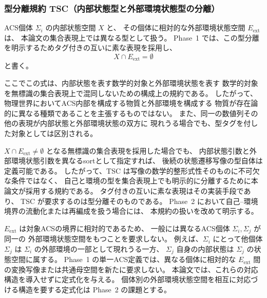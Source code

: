 \subsubsection*{型分離規約 TSC（内部状態型と外部環境状態型の分離）}
\label{conv:TSC}

ACS個体 $\Sigma_i$ の内部状態空間 $X$ と、
その個体に相対的な外部環境状態空間 $E_{\mathrm{ext}}$ は、
本論文の集合表現上では異なる型として扱う。
Phase~1 では、この型分離を明示するためタグ付きの互いに素な表現を採用し、
\[
  X\cap E_{\mathrm{ext}}=\emptyset
\]
と書く。

ここでこの式は、内部状態を表す数学的対象と外部環境状態を表す
数学的対象を無標識の集合表現上で混同しないための構成上の規約である。
したがって、物理世界においてACS内部を構成する物質と外部環境を構成する
物質が存在論的に異なる種類であることを主張するものではない。
また、同一の数値列その他の表現が内部状態と外部環境状態の双方に
現れうる場合でも、型タグを付した対象としては区別される。

\begin{remark}[TSCの性格]
\label{rem:TSC_character}
$X\cap E_{\mathrm{ext}}\neq\emptyset$ となる無標識の集合表現を採用した場合でも、
内部状態引数と外部環境状態引数を異なるsortとして指定すれば、
後続の状態遷移写像の型自体は定義可能である。
したがって、TSC は写像の数学的整形式性そのものに不可欠な条件ではなく、
自己と環境の型を集合表現上でも明示的に分離するために本論文が採用する規約である。
タグ付きの互いに素な表現はその実装手段であり、
TSC が要求するのは型分離そのものである。
Phase~2 において自己--環境境界の流動化または再編成を扱う場合には、
本規約の扱いを改めて明示する。
\end{remark}

\begin{remark}[外部環境状態空間の個体相対性]
\label{rem:Eext_relative}
$E_{\mathrm{ext}}$ は対象ACSの境界に相対的であるため、
一般には異なるACS個体 $\Sigma_i,\Sigma_j$ が同一の
外部環境状態空間をもつことを要求しない。
例えば、$\Sigma_i$ にとって他個体 $\Sigma_j$ は
$\Sigma_i$ の外部環境の一部として現れうる一方、
$\Sigma_j$ 自身の内部状態は $\Sigma_j$ の状態空間に属する。
Phase~1 の単一ACS定義では、異なる個体に相対的な
$E_{\mathrm{ext}}$ 間の変換写像または共通母空間を新たに要求しない。
本論文では、これらの対応構造を導入せずに定式化を与える。
個体別の外部環境状態空間を相互に対応づける構造を要する定式化は
Phase~2 の課題とする。
\end{remark}

